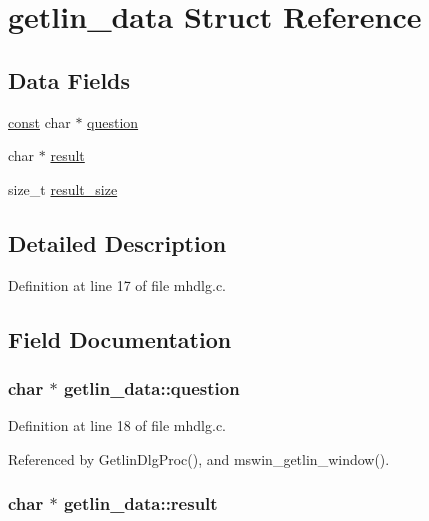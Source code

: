 \hypertarget{structgetlin__data}{\section{getlin\+\_\+data Struct Reference}
\label{structgetlin__data}
}
\subsection*{Data Fields}
\begin{DoxyCompactItemize}
\item 
\hyperlink{tradstdc_8h_a2c212835823e3c54a8ab6d95c652660e}{const} char $\ast$ \hyperlink{structgetlin__data_a5ae51373bc945ad0f57b44419c26b7a8}{question}
\item 
char $\ast$ \hyperlink{structgetlin__data_a30ab6084717e9691c3ecae6fbeac21b9}{result}
\item 
size\+\_\+t \hyperlink{structgetlin__data_a94955d5ee37e0a74dce5438809152c34}{result\+\_\+size}
\end{DoxyCompactItemize}


\subsection{Detailed Description}


Definition at line 17 of file mhdlg.\+c.



\subsection{Field Documentation}
\hypertarget{structgetlin__data_a5ae51373bc945ad0f57b44419c26b7a8}{
\subsubsection[{question}]{ char $\ast$ getlin\+\_\+data\+::question}}\label{structgetlin__data_a5ae51373bc945ad0f57b44419c26b7a8}


Definition at line 18 of file mhdlg.\+c.



Referenced by Getlin\+Dlg\+Proc(), and mswin\+\_\+getlin\+\_\+window().

\hypertarget{structgetlin__data_a30ab6084717e9691c3ecae6fbeac21b9}{
\subsubsection[{result}]{\setlength{\rightskip}{0pt plus 5cm}char $\ast$ getlin\+\_\+data\+::result}}\label{structgetlin__data_a30ab6084717e9691c3ecae6fbeac21b9}



